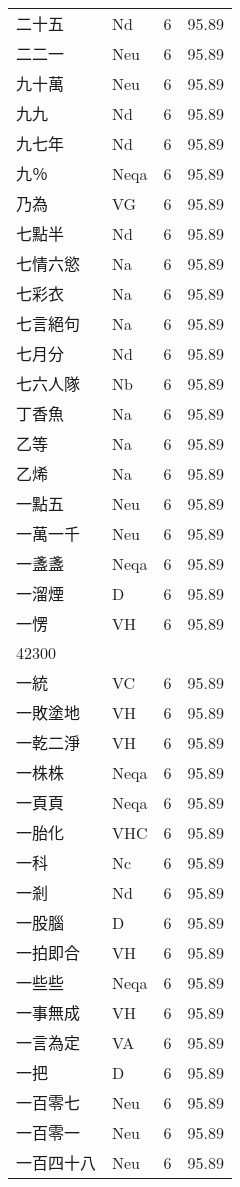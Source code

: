 \documentclass[twocolumn]{book}
\begin{document}
\begin{supertabular}{llrr}
二十五 & Nd & 6 &  95.89\\
二二一 & Neu & 6 &  95.89\\
九十萬 & Neu & 6 &  95.89\\
九九 & Nd & 6 &  95.89\\
九七年 & Nd & 6 &  95.89\\
九％ & Neqa & 6 &  95.89\\
乃為 & VG & 6 &  95.89\\
七點半 & Nd & 6 &  95.89\\
七情六慾 & Na & 6 &  95.89\\
七彩衣 & Na & 6 &  95.89\\
七言絕句 & Na & 6 &  95.89\\
七月分 & Nd & 6 &  95.89\\
七六人隊 & Nb & 6 &  95.89\\
丁香魚 & Na & 6 &  95.89\\
乙等 & Na & 6 &  95.89\\
乙烯 & Na & 6 &  95.89\\
一點五 & Neu & 6 &  95.89\\
一萬一千 & Neu & 6 &  95.89\\
一盞盞 & Neqa & 6 &  95.89\\
一溜煙 & D & 6 &  95.89\\
一愣 & VH & 6 &  95.89\\
42300\\
一統 & VC & 6 &  95.89\\
一敗塗地 & VH & 6 &  95.89\\
一乾二淨 & VH & 6 &  95.89\\
一株株 & Neqa & 6 &  95.89\\
一頁頁 & Neqa & 6 &  95.89\\
一胎化 & VHC & 6 &  95.89\\
一科 & Nc & 6 &  95.89\\
一剎 & Nd & 6 &  95.89\\
一股腦 & D & 6 &  95.89\\
一拍即合 & VH & 6 &  95.89\\
一些些 & Neqa & 6 &  95.89\\
一事無成 & VH & 6 &  95.89\\
一言為定 & VA & 6 &  95.89\\
一把 & D & 6 &  95.89\\
一百零七 & Neu & 6 &  95.89\\
一百零一 & Neu & 6 &  95.89\\
一百四十八 & Neu & 6 &  95.89\\

\end{supertabular}
\end{document}
